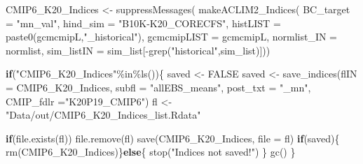 \documentclass[
]{article}
\newenvironment{Shaded}{\begin{snugshade}}{\end{snugshade}}
\newcommand{\AttributeTok}[1]{\textcolor[rgb]{0.77,0.63,0.00}{#1}}
\newcommand{\ConstantTok}[1]{\textcolor[rgb]{0.00,0.00,0.00}{#1}}
\newcommand{\ControlFlowTok}[1]{\textcolor[rgb]{0.13,0.29,0.53}{\textbf{#1}}}
\newcommand{\FunctionTok}[1]{\textcolor[rgb]{0.00,0.00,0.00}{#1}}
\newcommand{\NormalTok}[1]{#1}
\newcommand{\OtherTok}[1]{\textcolor[rgb]{0.56,0.35,0.01}{#1}}
\newcommand{\SpecialCharTok}[1]{\textcolor[rgb]{0.00,0.00,0.00}{#1}}
\newcommand{\StringTok}[1]{\textcolor[rgb]{0.31,0.60,0.02}{#1}}
\begin{document}
\begin{Shaded}
\begin{Highlighting}[]
\NormalTok{     CMIP6\_K20\_Indices }\OtherTok{\textless{}{-}} \FunctionTok{suppressMessages}\NormalTok{(}
                        \FunctionTok{makeACLIM2\_Indices}\NormalTok{(}
                        \AttributeTok{BC\_target =} \StringTok{"mn\_val"}\NormalTok{,}
                        \AttributeTok{hind\_sim  =}  \StringTok{"B10K{-}K20\_CORECFS"}\NormalTok{,}
                        \AttributeTok{histLIST  =} \FunctionTok{paste0}\NormalTok{(gcmcmipL,}\StringTok{"\_historical"}\NormalTok{),}
                        \AttributeTok{gcmcmipLIST =}\NormalTok{ gcmcmipL,}
                        \AttributeTok{normlist\_IN =}\NormalTok{ normlist,}
                        \AttributeTok{sim\_listIN =}\NormalTok{ sim\_list[}\SpecialCharTok{{-}}\FunctionTok{grep}\NormalTok{(}\StringTok{"historical"}\NormalTok{,sim\_list)]))}
    
     \ControlFlowTok{if}\NormalTok{(}\StringTok{"CMIP6\_K20\_Indices"}\SpecialCharTok{\%in\%}\FunctionTok{ls}\NormalTok{())\{  }
\NormalTok{      saved }\OtherTok{\textless{}{-}} \ConstantTok{FALSE}
\NormalTok{      saved }\OtherTok{\textless{}{-}} \FunctionTok{save\_indices}\NormalTok{(}\AttributeTok{flIN =}\NormalTok{ CMIP6\_K20\_Indices, }
                   \AttributeTok{subfl =} \StringTok{"allEBS\_means"}\NormalTok{,}
                   \AttributeTok{post\_txt =} \StringTok{"\_mn"}\NormalTok{,}
                   \AttributeTok{CMIP\_fdlr =}\StringTok{"K20P19\_CMIP6"}\NormalTok{)}
\NormalTok{      fl }\OtherTok{\textless{}{-}} \StringTok{"Data/out/CMIP6\_K20\_Indices\_list.Rdata"}
      
      \ControlFlowTok{if}\NormalTok{(}\FunctionTok{file.exists}\NormalTok{(fl)) }\FunctionTok{file.remove}\NormalTok{(fl)}
      \FunctionTok{save}\NormalTok{(CMIP6\_K20\_Indices, }\AttributeTok{file =}\NormalTok{ fl)}
      \ControlFlowTok{if}\NormalTok{(saved)\{}
        \FunctionTok{rm}\NormalTok{(CMIP6\_K20\_Indices)\}}\ControlFlowTok{else}\NormalTok{\{}
          \FunctionTok{stop}\NormalTok{(}\StringTok{"Indices not saved!"}\NormalTok{)}
\NormalTok{        \}}
      \FunctionTok{gc}\NormalTok{()}
\NormalTok{     \}}
    

\end{Highlighting}
\end{Shaded}
\end{document}
